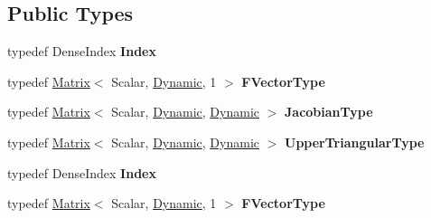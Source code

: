 \subsection*{Public Types}
\begin{DoxyCompactItemize}
\item 
\mbox{\label{class_eigen_1_1_hybrid_non_linear_solver_a7d18b9b4dfd016ba552961903afd40e2}} 
typedef Dense\+Index {\bfseries Index}
\item 
\mbox{\label{class_eigen_1_1_hybrid_non_linear_solver_a6b474d4da7339c9aa89cf223796e3a69}} 
typedef \hyperlink{group___core___module_class_eigen_1_1_matrix}{Matrix}$<$ Scalar, \hyperlink{namespace_eigen_ad81fa7195215a0ce30017dfac309f0b2}{Dynamic}, 1 $>$ {\bfseries F\+Vector\+Type}
\item 
\mbox{\label{class_eigen_1_1_hybrid_non_linear_solver_a55713d5bb80e014eb649b7d621ab3562}} 
typedef \hyperlink{group___core___module_class_eigen_1_1_matrix}{Matrix}$<$ Scalar, \hyperlink{namespace_eigen_ad81fa7195215a0ce30017dfac309f0b2}{Dynamic}, \hyperlink{namespace_eigen_ad81fa7195215a0ce30017dfac309f0b2}{Dynamic} $>$ {\bfseries Jacobian\+Type}
\item 
\mbox{\label{class_eigen_1_1_hybrid_non_linear_solver_afd427708a3c3b71bfbeda613ed68febb}} 
typedef \hyperlink{group___core___module_class_eigen_1_1_matrix}{Matrix}$<$ Scalar, \hyperlink{namespace_eigen_ad81fa7195215a0ce30017dfac309f0b2}{Dynamic}, \hyperlink{namespace_eigen_ad81fa7195215a0ce30017dfac309f0b2}{Dynamic} $>$ {\bfseries Upper\+Triangular\+Type}
\item 
\mbox{\label{class_eigen_1_1_hybrid_non_linear_solver_a7d18b9b4dfd016ba552961903afd40e2}} 
typedef Dense\+Index {\bfseries Index}
\item 
\mbox{\label{class_eigen_1_1_hybrid_non_linear_solver_a6b474d4da7339c9aa89cf223796e3a69}} 
typedef \hyperlink{group___core___module_class_eigen_1_1_matrix}{Matrix}$<$ Scalar, \hyperlink{namespace_eigen_ad81fa7195215a0ce30017dfac309f0b2}{Dynamic}, 1 $>$ {\bfseries F\+Vector\+Type}
\item 

\end{DoxyCompactItemize}
